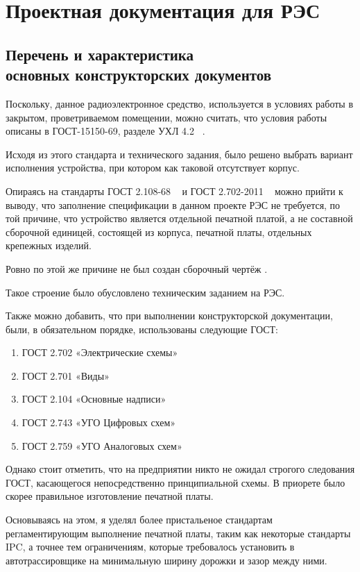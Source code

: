 \section{Проектная документация для РЭС}

\subsection{Перечень и характеристика\\
  основных конструкторских документов}

Поскольку,
данное радиоэлектронное средство,
используется в условиях работы в закрытом, проветриваемом помещении,
можно считать, что условия работы описаны в ГОСТ-15150-69,
разделе УХЛ 4.2 ~\cite{GOST-15150-69}.

Исходя из этого стандарта и технического задания,
было решено выбрать вариант исполнения устройства,
при котором как таковой отсутствует корпус.

Опираясь на стандарты ГОСТ 2.108-68 ~\cite{GOST-spec}
и ГОСТ 2.702-2011 ~\cite{GOST-2-702-2011} можно прийти к выводу,
что заполнение спецификации в данном проекте РЭС не требуется,
по той причине, что устройство является отдельной печатной платой,
а не составной сборочной единицей,
состоящей из корпуса, печатной платы,
отдельных крепежных изделий.

Ровно по этой же причине не был создан сборочный чертёж .

Такое строение было обусловлено техническим заданием на РЭС.

Также можно добавить, что при выполнении конструкторской документации,
были, в обязательном порядке, использованы следующие ГОСТ:
\begin{enumerate}
\item ГОСТ 2.702 «Электрические схемы»  
\item ГОСТ 2.701 «Виды»                 
\item ГОСТ 2.104 «Основные надписи»     
\item ГОСТ 2.743 «УГО Цифровых схем»    
\item ГОСТ 2.759 «УГО Аналоговых схем»  
\end{enumerate}

Однако стоит отметить, что на предприятии никто не ожидал
строгого следования ГОСТ, касающегося непосредственно
принципиальной схемы. В приорете было скорее правильное изготовление печатной платы.

Основываясь на этом,
я уделял более пристальеное стандартам регламентирующим
выполнение печатной платы, таким как некоторые стандарты IPC,
а точнее тем ограничениям, которые требовалось установить в
автотрассировщике на минимальную ширину дорожки и зазор между ними.

